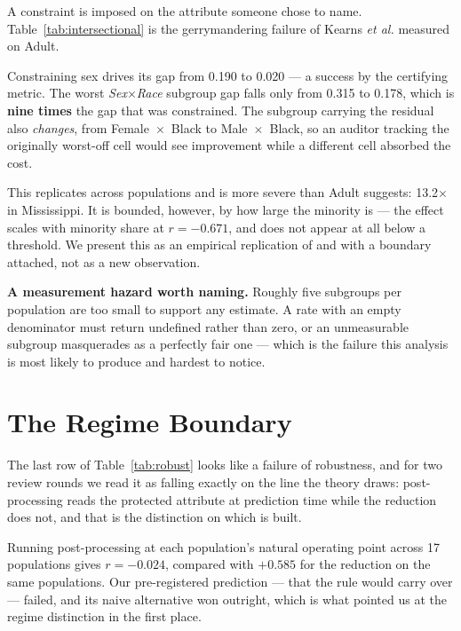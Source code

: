 \documentclass[9pt,conference]{IEEEtran}
\begin{document}
A constraint is imposed on the attribute someone chose to name.
Table~\ref{tab:intersectional} is the gerrymandering failure of Kearns \emph{et al.}
\cite{kearns2018} measured on Adult.

Constraining sex drives its gap from 0.190 to 0.020 --- a success by the certifying metric.
The worst \emph{Sex}$\times$\emph{Race} subgroup gap falls only from 0.315 to 0.178, which is
\textbf{nine times} the gap that was constrained. The subgroup carrying the residual also
\emph{changes}, from Female~$\times$~Black to Male~$\times$~Black, so an auditor tracking the
originally worst-off cell would see improvement while a different cell absorbed the cost.

This replicates across populations and is more severe than Adult suggests: 13.2$\times$ in
Mississippi. It is bounded, however, by how large the minority is --- the effect scales with
minority share at $r = -0.671$, and does not appear at all below a threshold. We present this
as an empirical replication of \cite{kearns2018} and \cite{maheshwari2023} with a boundary
attached, not as a new observation.

\textbf{A measurement hazard worth naming.} Roughly five subgroups per population are too small
to support any estimate. A rate with an empty denominator must return undefined rather than
zero, or an unmeasurable subgroup masquerades as a perfectly fair one --- which is the failure
this analysis is most likely to produce and hardest to notice.

\section{The Regime Boundary}
\label{sec:regime}

The last row of Table~\ref{tab:robust} looks like a failure of robustness, and for two
review rounds we read it as falling exactly on the line the theory draws: post-processing
reads the protected attribute at prediction time while the reduction does not, and that
is the distinction on which \cite{backfire2026} is built.

Running post-processing at each population's natural operating point across 17 populations
gives $r = -0.024$, compared with $+0.585$ for the reduction on the same populations. Our
pre-registered prediction --- that the rule would carry over --- failed, and its naive
alternative won outright, which is what pointed us at the regime distinction in the first
place.
\end{document}
